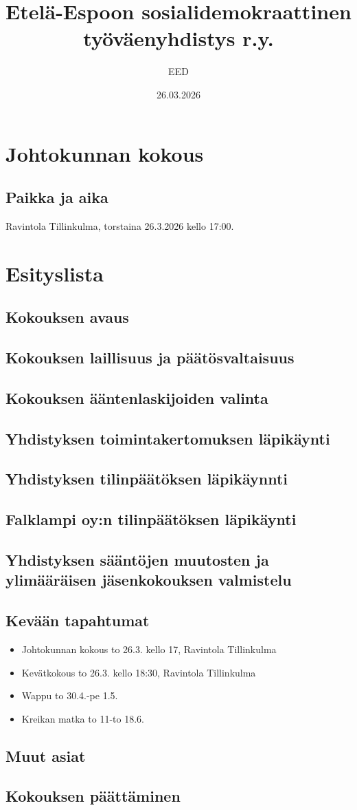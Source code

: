 \documentclass[a4paper,12pt]{article}
\title{Etelä-Espoon sosialidemokraattinen työväenyhdistys r.y.}
\author{EED}
\date{26.03.2026}
\begin{document}
\maketitle
\tableofcontents
\section*{Johtokunnan kokous}
\subsection*{Paikka ja aika}
Ravintola Tillinkulma, torstaina 26.3.2026 kello 17:00.
\section*{Esityslista}
\subsection{Kokouksen avaus}
\subsection{Kokouksen laillisuus ja päätösvaltaisuus}
\subsection{Kokouksen ääntenlaskijoiden valinta}
\subsection{Yhdistyksen toimintakertomuksen läpikäynti}
\subsection{Yhdistyksen tilinpäätöksen läpikäynnti}
\subsection{Falklampi oy:n tilinpäätöksen läpikäynti}
\subsection{Yhdistyksen sääntöjen muutosten ja ylimääräisen jäsenkokouksen valmistelu}
\subsection{Kevään tapahtumat}
\begin{itemize}
\item{Johtokunnan kokous} to 26.3. kello 17, Ravintola Tillinkulma
\item{Kevätkokous} to 26.3. kello 18:30, Ravintola Tillinkulma
\item{Wappu} to 30.4.-pe 1.5.
\item{Kreikan matka} to 11-to 18.6.
\end{itemize}
\subsection{Muut asiat}
\subsection{Kokouksen päättäminen}
\end{document}
